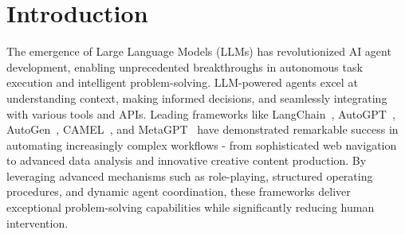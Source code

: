 \section{Introduction}
\label{sec:intro}



The emergence of Large Language Models (LLMs) has revolutionized AI agent development, enabling unprecedented breakthroughs in autonomous task execution and intelligent problem-solving. LLM-powered agents excel at understanding context, making informed decisions, and seamlessly integrating with various tools and APIs. Leading frameworks like LangChain~\cite{langchain2023}, AutoGPT~\cite{AutoGPT}, AutoGen~\cite{autogen}, CAMEL~\cite{camel}, and MetaGPT~\cite{hong2024metagpt} have demonstrated remarkable success in automating increasingly complex workflows - from sophisticated web navigation to advanced data analysis and innovative creative content production. By leveraging advanced mechanisms such as role-playing, structured operating procedures, and dynamic agent coordination, these frameworks deliver exceptional problem-solving capabilities while significantly reducing human intervention.

